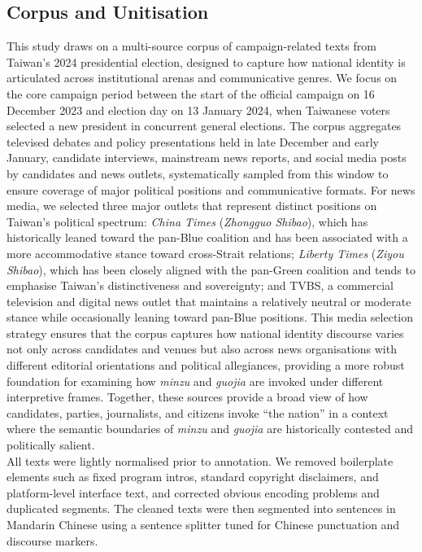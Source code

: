 \documentclass[man,12pt]{apa7}
\begin{document}
\subsection{Corpus and Unitisation}

This study draws on a multi-source corpus of campaign-related texts from Taiwan's 2024 presidential election, designed to capture how national identity is articulated across institutional arenas and communicative genres. 
We focus on the core campaign period between the start of the official campaign on 16 December 2023 and election day on 13 January 2024, when Taiwanese voters selected a new president in concurrent general elections. 
The corpus aggregates televised debates and policy presentations held in late December and early January, candidate interviews, mainstream news reports, and social media posts by candidates and news outlets, systematically sampled from this window to ensure coverage of major political positions and communicative formats. 
For news media, we selected three major outlets that represent distinct positions on Taiwan's political spectrum: \emph{China Times} (\emph{Zhongguo Shibao}), which has historically leaned toward the pan-Blue coalition and has been associated with a more accommodative stance toward cross-Strait relations; \emph{Liberty Times} (\emph{Ziyou Shibao}), which has been closely aligned with the pan-Green coalition and tends to emphasise Taiwan's distinctiveness and sovereignty; and TVBS, a commercial television and digital news outlet that maintains a relatively neutral or moderate stance while occasionally leaning toward pan-Blue positions. 
This media selection strategy ensures that the corpus captures how national identity discourse varies not only across candidates and venues but also across news organisations with different editorial orientations and political allegiances, providing a more robust foundation for examining how \emph{minzu} and \emph{guojia} are invoked under different interpretive frames. 
Together, these sources provide a broad view of how candidates, parties, journalists, and citizens invoke ``the nation'' in a context where the semantic boundaries of \emph{minzu} and \emph{guojia} are historically contested and politically salient.\\%
All texts were lightly normalised prior to annotation. 
We removed boilerplate elements such as fixed program intros, standard copyright disclaimers, and platform-level interface text, and corrected obvious encoding problems and duplicated segments. 
The cleaned texts were then segmented into sentences in Mandarin Chinese using a sentence splitter tuned for Chinese punctuation and discourse markers. 
\end{document}
